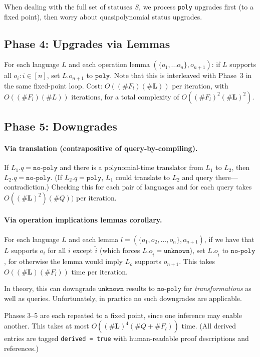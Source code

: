 \documentclass[10pt]{article}
\theoremstyle{plain}
\theoremstyle{definition}
\theoremstyle{remark}
\begin{document}
When dealing with the full set of statuses $S$, we process \texttt{poly} upgrades first (to a fixed point), then worry about quasipolynomial status upgrades.

\subsection{Phase 4: Upgrades via Lemmas}

For each language $L$ and each operation lemma $(\{o_1,...o_n\}, o_{n+1})$: if $L$ supports all $o_i: i \in [n]$, set $L.o_{n+1}$ to $\texttt{poly}$. Note that this is interleaved with Phase~3 in the same fixed-point loop. Cost: $O((\#F_l)(\#\textbf{L}))$ per iteration, with $O((\#F_l)(\#L))$ iterations, for a total complexity of $O((\#F_l)^2(\#\textbf{L})^2)$.
\subsection{Phase 5: Downgrades}

\paragraph{Via translation (contrapositive of query-by-compiling).}
If $L_1.q = \texttt{no-poly}$ and there is a polynomial-time translator from $L_1$ to $L_2$, then $L_2.q = \texttt{no-poly}$. (If $L_2.q = \texttt{poly}$, $L_1$ could translate to $L_2$ and query there---contradiction.) Checking this for each pair of languages and for each query takes $O((\#\textbf{L})^2)(\#Q))$ per iteration.

\paragraph{Via operation implications lemmas corollary.}
For each language $L$ and each lemma $l=(\{o_1,o_2,...,o_n\},o_{n+1})$, if we have that $L$ supports $o_i$ for all $i$ except $\tilde i$ (which forces $L.o_{\tilde i}=\texttt{unknown}$), set $L.o_{\tilde i}$ to $\texttt{no-poly}$, for otherwise the lemma would imply $L_o$ supports $o_{n+1}$. This takes $O((\#\textbf{L})(\#F_l))$ time per iteration.

In theory, this can downgrade $\texttt{unknown}$ results to $\texttt{no-poly}$ for \emph{transformations} as well as queries. Unfortunately, in practice no such downgrades are applicable.

Phases 3--5 are each repeated to a fixed point, since one inference may enable another. This takes at most $O((\#\textbf{L})^4(\#Q + \#F_l))$ time. (All derived entries are tagged \texttt{derived = true} with human-readable proof descriptions and references.)
\end{document}
